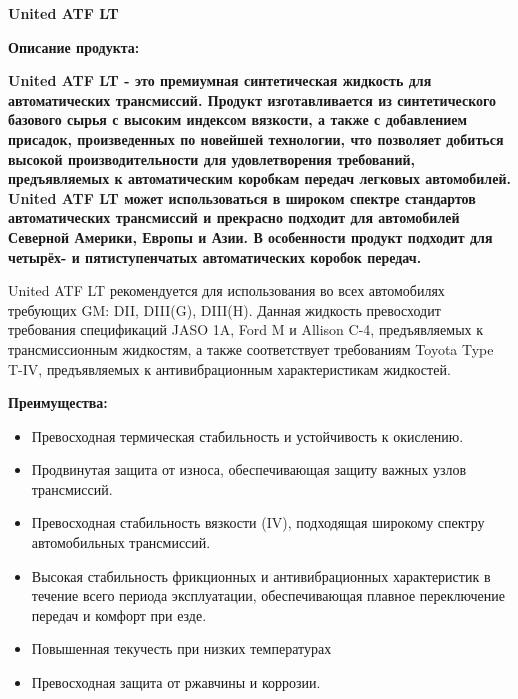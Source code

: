 \documentclass[12pt,a4paper]{article}
\begin{document}
\begin{spacing}{2.5}
{\textbf{\fontsize{20pt}{30pt}\selectfont United ATF LT}}
\end{spacing}

\begin{spacing}{2.5}
{\textbf{\fontsize{14pt}{4pt}\selectfont Описание продукта:}}
\end{spacing}

{\textbf{United ATF LT - это премиумная синтетическая жидкость для автоматических трансмиссий. Продукт изготавливается из синтетического базового сырья с высоким индексом вязкости, а также с добавлением присадок, произведенных по новейшей технологии, что позволяет добиться  высокой производительности для удовлетворения требований, предъявляемых к автоматическим коробкам передач легковых автомобилей. United ATF LT может использоваться в широком спектре стандартов автоматических трансмиссий и прекрасно подходит для автомобилей Северной Америки, Европы и Азии. В особенности продукт подходит для четырёх- и пятиступенчатых автоматических коробок передач.}}

United ATF LT рекомендуется для использования во всех автомобилях требующих GM: DII, DIII(G), DIII(H). Данная жидкость превосходит требования спецификаций JASO 1A, Ford M и Allison C-4, предъявляемых к трансмиссионным жидкостям, а также соответствует требованиям Toyota Type T-IV, предъявляемых к антивибрационным характеристикам жидкостей.

\bigskip
{\textbf{\fontsize{14pt}{10pt}\selectfont Преимущества:}}

\begin{itemize}[itemsep=1.4pt]

\item  Превосходная термическая стабильность и устойчивость к окислению.
\item  Продвинутая защита от износа, обеспечивающая защиту важных узлов трансмиссий.
\item  Превосходная стабильность вязкости (IV), подходящая широкому спектру автомобильных трансмиссий.
\item  Высокая стабильность фрикционных и антивибрационных характеристик в течение всего периода эксплуатации, обеспечивающая плавное переключение передач и комфорт при езде.
\item  Повышенная текучесть при низких температурах
\item  Превосходная защита от ржавчины и коррозии.
 
\end{itemize}
\end{document}

